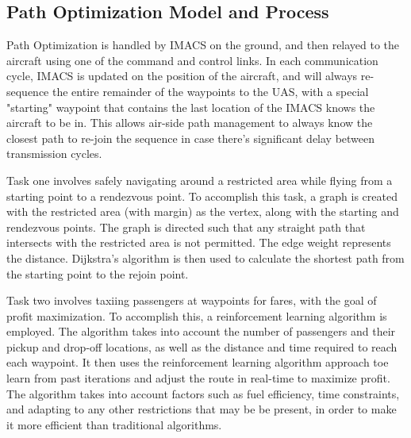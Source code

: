 \subsection{Path Optimization Model and Process}
\label{sec:path-optimization}

Path Optimization is handled by IMACS on the ground, and then relayed to the
aircraft using one of the command and control links. In each communication
cycle, IMACS is updated on the position of the aircraft, and will always
re-sequence the entire remainder of the waypoints to the UAS, with a special
"starting" waypoint that contains the last location of the IMACS knows the
aircraft to be in. This allows air-side path management to always know the
closest path to re-join the sequence in case there's significant delay between
transmission cycles.

Task one involves safely navigating around a restricted area while flying from
a starting point to a rendezvous point. To accomplish this task, a graph is
created with the restricted area (with margin) as the vertex, along with the
starting and rendezvous points. The graph is directed such that any straight
path that intersects with the restricted area is not permitted. The edge weight
represents the distance. Dijkstra's algorithm is then used to calculate the
shortest path from the starting point to the rejoin point.

Task two involves taxiing passengers at waypoints for fares, with the goal of
profit maximization. To accomplish this, a reinforcement learning algorithm is
employed. The algorithm takes into account the number of passengers and their
pickup and drop-off locations, as well as the distance and time required to
reach each waypoint. It then uses the reinforcement learning algorithm approach
toe learn from past iterations and adjust the route in real-time to maximize
profit. The algorithm takes into account factors such as fuel efficiency, time
constraints, and adapting to any other restrictions that may be be present, in
order to make it more efficient than traditional algorithms.
